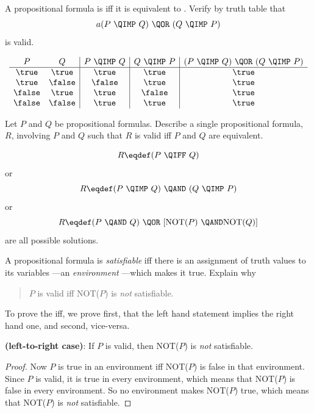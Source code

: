 \documentclass[handout]{mcs}
\begin{document}
\iffalse

\begin{problem}
\bparts

\ppart A propositional formula is  iff it is equivalent to
\true.  Verify by truth table that
\[
a(P\ \QIMP\ Q)\ \QOR\ (Q \ \QIMP\ P)
\]
is valid.

\begin{solution}

\[
\begin{array}{cc|c|c|c}
P & Q & P\ \QIMP\ Q & Q\ \QIMP\ P  & (P\ \QIMP\ Q)\ \QOR\ (Q \ \QIMP\ P)\\ \hline
\true & \true & \true & \true & \true\\
\true & \false & \false & \true & \true\\
\false & \true & \true & \false & \true\\
\false & \false & \true & \true & \true
\end{array}
\]

\end{solution}

\ppart Let $P$ and $Q$ be propositional formulas.  Describe a single
propositional formula, $R$, involving $P$ and $Q$ such that $R$ is valid
iff $P$ and $Q$ are equivalent.

\begin{solution}
\[R \eqdef (P \ \QIFF\ Q)\] or
\[R \eqdef (P \ \QIMP\ Q)\ \QAND\ (Q \ \QIMP\ P)\]
or
\[R \eqdef (P\ \QAND\  Q)\ \QOR\ [\text{NOT($P$)}\ \QAND
\text{NOT($Q$)}]\]
are all possible solutions.

\end{solution}

\ppart\label{sat} A propositional formula is \emph{satisfiable} iff there
is an assignment of truth values to its variables ---an \emph{environment}
---which makes it true.  Explain why
\begin{quote}
$P$ is valid iff NOT($P$) is \emph{not} satisfiable.
\end{quote}

\begin{solution}

To prove the iff, we prove first, that the left hand statement implies the
right hand one, and second, vice-versa.

\textbf{(left-to-right case)}: If $P$ is valid, then NOT($P$) is \emph{not}
satisfiable.

\begin{proof}
Now $P$ is true in an environment iff NOT($P$) is false in that
environment.  Since $P$ is valid, it is true in every environment, which
means that NOT($P$) is false in every environment.  So no environment makes
NOT($P$) true, which means that NOT($P$) is \emph{not} satisfiable.


\end{proof}
\end{solution}
\end{problem}
\end{document}
